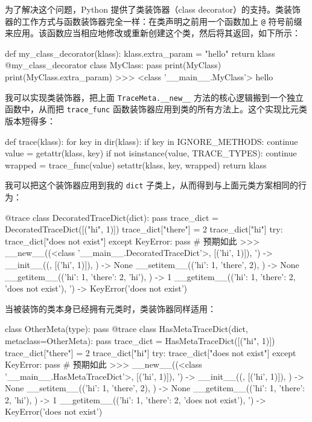 为了解决这个问题，Python 提供了类装饰器（class decorator）的支持。类装饰器的工作方式与函数装饰器完全一样：在类声明之前用一个函数加上 \texttt{@} 符号前缀来应用。该函数应当相应地修改或重新创建这个类，然后将其返回，如下所示：

\begin{codebox}[python]
def my_class_decorator(klass):
    klass.extra_param = "hello"
    return klass
@my_class_decorator
class MyClass:
    pass
print(MyClass)
print(MyClass.extra_param)
>>>
<class '__main__.MyClass'>
hello
\end{codebox}

我可以实现类装饰器，把上面 \texttt{TraceMeta.\_\_new\_\_} 方法的核心逻辑搬到一个独立函数中，从而把 \texttt{trace\_func} 函数装饰器应用到类的所有方法上。这个实现比元类版本短得多：

\begin{codebox}[python]
def trace(klass):
    for key in dir(klass):
        if key in IGNORE_METHODS:
            continue
        value = getattr(klass, key)
        if not isinstance(value, TRACE_TYPES):
            continue
        wrapped = trace_func(value)
        setattr(klass, key, wrapped)
    return klass
\end{codebox}

我可以把这个装饰器应用到我的 \texttt{dict} 子类上，从而得到与上面元类方案相同的行为：

\begin{codebox}[python]
@trace
class DecoratedTraceDict(dict):
    pass
trace_dict = DecoratedTraceDict([("hi", 1)])
trace_dict["there"] = 2
trace_dict["hi"]
try:
    trace_dict["does not exist"]
except KeyError:
    pass  # 预期如此
>>>
__new__((<class '__main__.DecoratedTraceDict'>, [('hi', 1)]),
'{}) -> {}
__init__(({}, [('hi', 1)]), {}) -> None
__setitem__(({'hi': 1}, 'there', 2), {}) -> None
__getitem__(({'hi': 1, 'there': 2}, 'hi'), {}) -> 1
__getitem__(({'hi': 1, 'there': 2}, 'does not exist'),
'{}) -> KeyError('does not exist')
\end{codebox}

当被装饰的类本身已经拥有元类时，类装饰器同样适用：

\begin{codebox}[python]
class OtherMeta(type):
    pass
@trace
class HasMetaTraceDict(dict, metaclass=OtherMeta):
    pass
trace_dict = HasMetaTraceDict([("hi", 1)])
trace_dict["there"] = 2
trace_dict["hi"]
try:
    trace_dict["does not exist"]
except KeyError:
    pass  # 预期如此
>>>
__new__((<class '__main__.HasMetaTraceDict'>, [('hi', 1)]),
'{}) -> {}
__init__(({}, [('hi', 1)]), {}) -> None
__setitem__(({'hi': 1}, 'there', 2), {}) -> None
__getitem__(({'hi': 1, 'there': 2}, 'hi'), {}) -> 1
__getitem__(({'hi': 1, 'there': 2}, 'does not exist'),
'{}) -> KeyError('does not exist')
\end{codebox}

